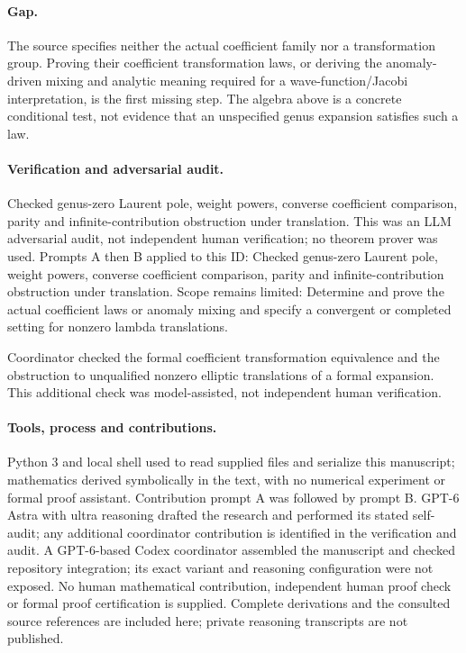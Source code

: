 \documentclass[11pt]{article}
\begin{document}
\paragraph{Gap.}The source specifies neither the actual coefficient family nor a transformation group. Proving their coefficient transformation laws, or deriving the anomaly-driven mixing and analytic meaning required for a wave-function/Jacobi interpretation, is the first missing step. The algebra above is a concrete conditional test, not evidence that an unspecified genus expansion satisfies such a law.

\paragraph{Verification and adversarial audit.}
Checked genus-zero Laurent pole, weight powers, converse coefficient comparison, parity and infinite-contribution obstruction under translation. This was an LLM adversarial audit, not independent human verification; no theorem prover was used. Prompts A then B applied to this ID: Checked genus-zero Laurent pole, weight powers, converse coefficient comparison, parity and infinite-contribution obstruction under translation. Scope remains limited: Determine and prove the actual coefficient laws or anomaly mixing and specify a convergent or completed setting for nonzero lambda translations.

Coordinator checked the formal coefficient transformation equivalence and the obstruction to unqualified nonzero elliptic translations of a formal expansion. This additional check was model-assisted, not independent human verification.

\paragraph{Tools, process and contributions.}
Python 3 and local shell used to read supplied files and serialize this manuscript; mathematics derived symbolically in the text, with no numerical experiment or formal proof assistant. Contribution prompt A was followed by prompt B. GPT-6 Astra with ultra reasoning drafted the research and performed its stated self-audit; any additional coordinator contribution is identified in the verification and audit. A GPT-6-based Codex coordinator assembled the manuscript and checked repository integration; its exact variant and reasoning configuration were not exposed. No human mathematical contribution, independent human proof check or formal proof certification is supplied. Complete derivations and the consulted source references are included here; private reasoning transcripts are not published.
\end{document}
